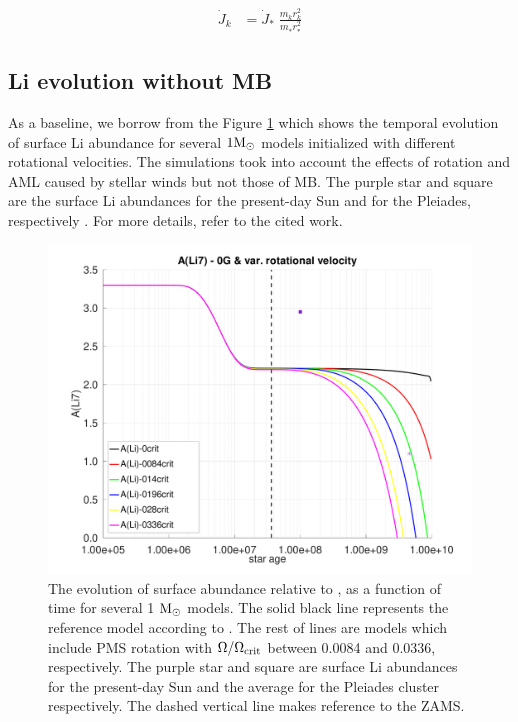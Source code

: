 \documentclass[fleqn,usenatbib]{mnras}
\begin{document}
\begin{ceqn}
\begin{align}
    \Dot{J}_{k} &= \Dot{J}_*\;\frac{m^{}_{k} r^2_{k}}{m^{}_* r_*^2} \label{eq:k_jdot}
\end{align}
\end{ceqn}

 

\subsection{Li evolution without MB}
As a baseline, we borrow from \cite{Navarro2020} the Figure \ref{fig:li_var_vel_0g} which shows the temporal evolution of surface Li abundance for several $1\mathrm{M}_\odot$ models initialized with different rotational velocities. The simulations took into account the effects of rotation and AML caused by stellar winds but not those of MB. The purple star and square are the surface Li abundances for the present-day Sun \citep{Asplund2009} and for the Pleiades, respectively \citep{Sestito2005}. For more details, refer to the cited work.\par

\begin{figure}
	\includegraphics[trim = 25mm 10mm 15mm 10mm, clip, width=\columnwidth]{figures/paper1/li_var_vel_0_0g.pdf}
    \caption{The evolution of surface  abundance relative to , as a function of time for several 1 $\mathrm{M}_\odot$ models. The solid black line represents the reference model according to \citet{Choi2016}. The rest of lines are models which include PMS rotation with $\Omega / \Omega_{\mathrm{crit}}$ between 0.0084 and 0.0336, respectively. The purple star and square are surface Li abundances for the present-day Sun \citep{Asplund2009} and the average for the Pleiades cluster \citep{Sestito2005} respectively. The dashed vertical line makes reference to the ZAMS.}
    \label{fig:li_var_vel_0g}
\end{figure}
\end{document}
